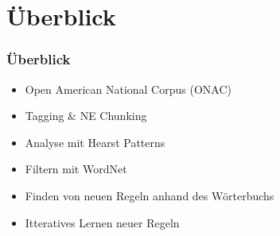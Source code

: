 \section{Überblick}
\label{sec:ueberblick}

\begin{frame}
  \frametitle{Überblick}

  \begin{itemize}
  \item Open American National Corpus (ONAC)
  \item Tagging \& NE Chunking
  \item Analyse mit Hearst Patterns
  \item Filtern mit WordNet
  \item Finden von neuen Regeln anhand des Wörterbuchs
  \item Itteratives Lernen neuer Regeln
  \end{itemize}
\end{frame}
